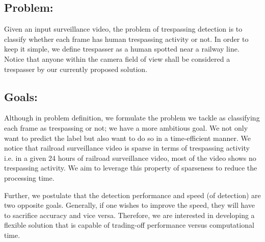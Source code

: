 \subsection{Problem:} Given an input surveillance video, the problem of trespassing detection is to classify whether each frame has human trespassing activity or not. In order to
keep it simple, we define trespasser as a human spotted near a railway line. Notice that anyone within the camera field of view shall be considered a trespasser by our currently proposed solution.
\subsection{Goals:} 
\label{sec:goal}
Although in problem definition, we formulate the problem we tackle as classifying each frame as trespassing or not; we have a more ambitious goal. We not only want to predict the label but also want to do so in a time-efficient manner. We notice that railroad surveillance video is sparse in terms of trespassing activity i.e. in a given 24 hours of railroad surveillance video, most of the video shows no trespassing activity. We aim to leverage this property of sparseness to reduce the processing time. 

Further, we postulate that the detection performance and speed (of detection) are two opposite goals. Generally, if one wishes to improve the speed, they will have to sacrifice accuracy and vice versa. Therefore, we are interested in developing a  flexible solution that is capable of trading-off performance versus computational time.